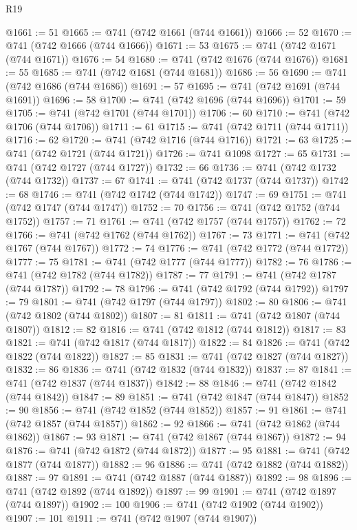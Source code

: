 \begin{lexlean}{R19}
\begin{coremodule}
@1661 := 51
@1665 := @741 (@742 @1661 (@744 @1661))
@1666 := 52
@1670 := @741 (@742 @1666 (@744 @1666))
@1671 := 53
@1675 := @741 (@742 @1671 (@744 @1671))
@1676 := 54
@1680 := @741 (@742 @1676 (@744 @1676))
@1681 := 55
@1685 := @741 (@742 @1681 (@744 @1681))
@1686 := 56
@1690 := @741 (@742 @1686 (@744 @1686))
@1691 := 57
@1695 := @741 (@742 @1691 (@744 @1691))
@1696 := 58
@1700 := @741 (@742 @1696 (@744 @1696))
@1701 := 59
@1705 := @741 (@742 @1701 (@744 @1701))
@1706 := 60
@1710 := @741 (@742 @1706 (@744 @1706))
@1711 := 61
@1715 := @741 (@742 @1711 (@744 @1711))
@1716 := 62
@1720 := @741 (@742 @1716 (@744 @1716))
@1721 := 63
@1725 := @741 (@742 @1721 (@744 @1721))
@1726 := @741 @1098
@1727 := 65
@1731 := @741 (@742 @1727 (@744 @1727))
@1732 := 66
@1736 := @741 (@742 @1732 (@744 @1732))
@1737 := 67
@1741 := @741 (@742 @1737 (@744 @1737))
@1742 := 68
@1746 := @741 (@742 @1742 (@744 @1742))
@1747 := 69
@1751 := @741 (@742 @1747 (@744 @1747))
@1752 := 70
@1756 := @741 (@742 @1752 (@744 @1752))
@1757 := 71
@1761 := @741 (@742 @1757 (@744 @1757))
@1762 := 72
@1766 := @741 (@742 @1762 (@744 @1762))
@1767 := 73
@1771 := @741 (@742 @1767 (@744 @1767))
@1772 := 74
@1776 := @741 (@742 @1772 (@744 @1772))
@1777 := 75
@1781 := @741 (@742 @1777 (@744 @1777))
@1782 := 76
@1786 := @741 (@742 @1782 (@744 @1782))
@1787 := 77
@1791 := @741 (@742 @1787 (@744 @1787))
@1792 := 78
@1796 := @741 (@742 @1792 (@744 @1792))
@1797 := 79
@1801 := @741 (@742 @1797 (@744 @1797))
@1802 := 80
@1806 := @741 (@742 @1802 (@744 @1802))
@1807 := 81
@1811 := @741 (@742 @1807 (@744 @1807))
@1812 := 82
@1816 := @741 (@742 @1812 (@744 @1812))
@1817 := 83
@1821 := @741 (@742 @1817 (@744 @1817))
@1822 := 84
@1826 := @741 (@742 @1822 (@744 @1822))
@1827 := 85
@1831 := @741 (@742 @1827 (@744 @1827))
@1832 := 86
@1836 := @741 (@742 @1832 (@744 @1832))
@1837 := 87
@1841 := @741 (@742 @1837 (@744 @1837))
@1842 := 88
@1846 := @741 (@742 @1842 (@744 @1842))
@1847 := 89
@1851 := @741 (@742 @1847 (@744 @1847))
@1852 := 90
@1856 := @741 (@742 @1852 (@744 @1852))
@1857 := 91
@1861 := @741 (@742 @1857 (@744 @1857))
@1862 := 92
@1866 := @741 (@742 @1862 (@744 @1862))
@1867 := 93
@1871 := @741 (@742 @1867 (@744 @1867))
@1872 := 94
@1876 := @741 (@742 @1872 (@744 @1872))
@1877 := 95
@1881 := @741 (@742 @1877 (@744 @1877))
@1882 := 96
@1886 := @741 (@742 @1882 (@744 @1882))
@1887 := 97
@1891 := @741 (@742 @1887 (@744 @1887))
@1892 := 98
@1896 := @741 (@742 @1892 (@744 @1892))
@1897 := 99
@1901 := @741 (@742 @1897 (@744 @1897))
@1902 := 100
@1906 := @741 (@742 @1902 (@744 @1902))
@1907 := 101
@1911 := @741 (@742 @1907 (@744 @1907))

\end{coremodule}
\end{lexlean}
